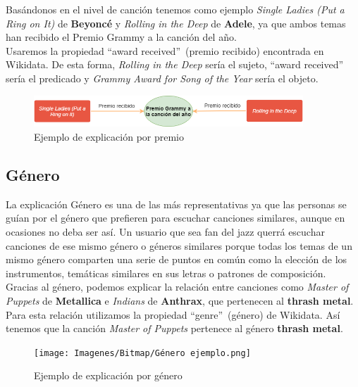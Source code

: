 Basándonos en el nivel de canción tenemos como ejemplo \textit{Single Ladies (Put a Ring on It)} de \textbf{Beyoncé} y \textit{Rolling in the Deep} de \textbf{Adele}, ya que ambos temas han recibido el Premio Grammy a la canción del año.\\

Usaremos la propiedad ``award received''~(premio recibido) encontrada en Wikidata. De esta forma, \textit{Rolling in the Deep} sería el sujeto, ``award received'' sería el predicado y \textit{Grammy Award for Song of the Year} sería el objeto.\\

\begin{figure}[h!]
	\centering
	\includegraphics[width = 0.9\textwidth]{Imagenes/Bitmap/Premio ejemplo.png}
	\caption{Ejemplo de explicación por premio}
	\label{fig:sampleImage}
\end{figure}

\subsection*{Género}

La explicación Género es una de las más representativas ya que las personas se guían por el género que prefieren para escuchar canciones similares, aunque en ocasiones no deba ser así. Un usuario que sea fan del jazz querrá escuchar canciones de ese mismo género o géneros similares porque todas los temas de un mismo género comparten una serie de puntos en común como la elección de los instrumentos, temáticas similares en sus letras o patrones de composición.\\

Gracias al género, podemos explicar la relación entre canciones como \textit{Master of Puppets} de \textbf{Metallica} e \textit{Indians} de \textbf{Anthrax}, que pertenecen al \textbf{thrash metal}.\\

Para esta relación utilizamos la propiedad ``genre''~(género) de Wikidata. Así tenemos que la canción \textit{Master of Puppets} pertenece al género \textbf{thrash metal}.\\

\begin{figure}[h!]
	\centering
	\texttt{[image: Imagenes/Bitmap/Género ejemplo.png]}
	\caption{Ejemplo de explicación por género}
	\label{fig:sampleImage}
\end{figure}


